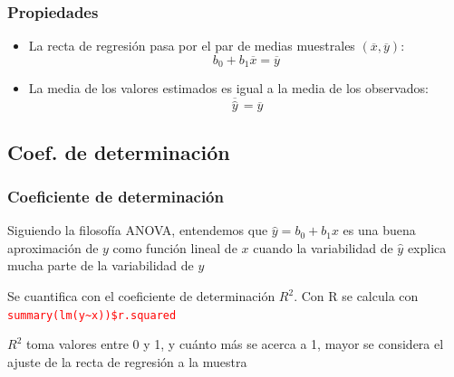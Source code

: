 \documentclass[12pt,t]{beamer}
\newcommand{\red}[1]{\textcolor{red}{#1}}
\renewcommand{\emph}[1]{{\color{red}#1}}
\theoremstyle{plain}
\theoremstyle{definition}
\begin{document}
\begin{frame}
\frametitle{Propiedades}

\begin{itemize}
\item La recta de regresión pasa por el par de medias muestrales 
$(\overline{x},\overline{y})$:
$$
b_0+b_1 \overline{x}=\overline{y}
$$

\item La media de los valores estimados es igual a la media de los
observados:
$$
\overline{\,\widehat{y}\,} = \overline{y}
$$
\end{itemize}

\end{frame}

\subsection{Coef. de determinación}%
\begin{frame}
\frametitle{Coeficiente de determinación}

Siguiendo la filosofía ANOVA, entendemos que  $\widehat{y}=b_0+b_1x$ es una buena aproximación de $y$ como función lineal de $x$ cuando la variabilidad de $\widehat{y}$ explica mucha parte de la variabilidad de $y$\bigskip

Se cuantifica con el \emph{coeficiente de determinación $R^2$}. Con R se calcula con
\red{\tt summary(lm(y\~{}x))\$r.squared}\bigskip

$R^2$ toma valores entre 0 y 1, y cuánto más se acerca a 1, mayor se considera el ajuste de la recta de regresión a la muestra

\end{frame}
\end{document}
